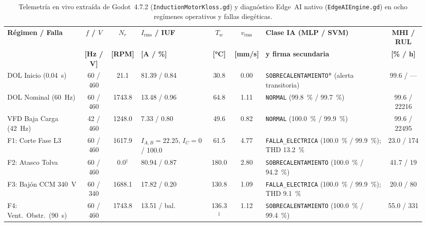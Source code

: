 \begin{table}[!t]
\begingroup
\setlength{\tabcolsep}{3.0pt}
\renewcommand{\arraystretch}{1.04}
\centering\footnotesize
\caption{Telemetría en vivo extraída de Godot~4.7.2 (\texttt{InductionMotorKloss.gd}) y diagnóstico Edge~AI nativo (\texttt{EdgeAIEngine.gd}) en ocho regímenes operativos y fallas diegéticas.}
\label{tab:telemetria_fallas}
\begin{tabularx}{\textwidth}{@{} >{\raggedright\arraybackslash}p{2.75cm} c c >{\raggedright\arraybackslash}p{2.70cm} c c >{\raggedright\arraybackslash}X c @{}}
\toprule
\textbf{Régimen / Falla} & \textbf{$f$ / $V$} & \textbf{$N_r$} & \textbf{$I_{\text{rms}}$ / IUF} & \textbf{$T_w$} & \textbf{$v_{\text{rms}}$} & \textbf{Clase IA (MLP / SVM)} & \textbf{MHI / RUL} \\
 & \textbf{[Hz / V]} & \textbf{[RPM]} & \textbf{[A / \%]} & \textbf{[\unit{\celsius}]} & \textbf{[mm/s]} & \textbf{y firma secundaria} & \textbf{[\% / h]} \\
\midrule
DOL Inicio (\qty{0.04}{\second}) & 60 / 460 & \num{21.1} & \num{81.39} / \num{0.84} & \num{30.8} & \num{0.00} & \texttt{SOBRECALENTAMIENTO}* (alerta transitoria) & \num{99.6} / --- \\
DOL Nominal (\qty{60}{\hertz}) & 60 / 460 & \num{1743.8} & \num{13.48} / \num{0.96} & \num{64.8} & \num{1.11} & \texttt{NORMAL} (\qty{99.8}{\percent} / \qty{99.7}{\percent}) & \num{99.6} / \num{22216} \\
VFD Baja Carga (\qty{42}{\hertz}) & 42 / 460 & \num{1248.0} & \num{7.33} / \num{0.80} & \num{49.6} & \num{0.82} & \texttt{NORMAL} (\qty{100.0}{\percent} / \qty{99.9}{\percent}) & \num{99.6} / \num{22495} \\
F1: Corte Fase L3 & 60 / 460 & \num{1617.9} & $I_{A,B}=\num{22.25}$, $I_C=0$ / \num{100.0} & \num{61.5} & \num{4.77} & \texttt{FALLA\_ELECTRICA} (\qty{100.0}{\percent} / \qty{99.9}{\percent}); THD \qty{13.2}{\percent} & \num{23.0} / \num{174} \\
F2: Atasco Tolva & 60 / 460 & \num{0.0}$^\dagger$ & \num{80.94} / \num{0.87} & \num{180.0} & \num{2.80} & \texttt{SOBRECALENTAMIENTO} (\qty{100.0}{\percent} / \qty{94.2}{\percent}) & \num{41.7} / \num{19} \\
F3: Bajón CCM \qty{340}{\volt} & 60 / 340 & \num{1688.1} & \num{17.82} / \num{0.20} & \num{130.8} & \num{1.09} & \texttt{FALLA\_ELECTRICA} (\qty{100.0}{\percent} / \qty{99.9}{\percent}); THD \qty{9.1}{\percent} & \num{20.0} / \num{80} \\
F4: Vent.\ Obstr.\ (\qty{90}{\second}) & 60 / 460 & \num{1743.8} & \num{13.51} / bal. & \num{136.3}$^\ddagger$ & \num{1.12} & \texttt{SOBRECALENTAMIENTO} (\qty{100.0}{\percent} / \qty{99.4}{\percent}) & \num{55.0} / \num{331} \\

\end{tabularx}
\end{table}
